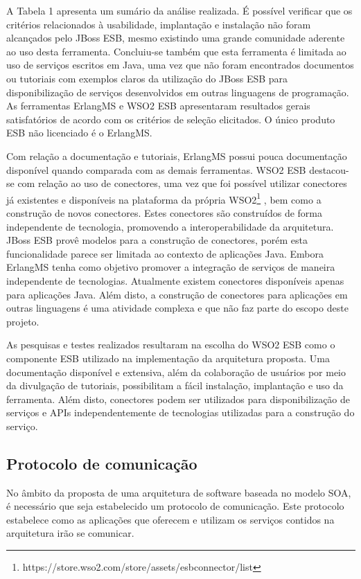 A Tabela 1 apresenta um sumário da análise realizada. É possível verificar que os critérios relacionados à usabilidade, implantação e instalação não foram alcançados pelo JBoss ESB, mesmo existindo uma grande comunidade aderente ao uso desta ferramenta. Concluiu-se também que esta ferramenta é limitada ao uso de serviços escritos em Java, uma vez que não foram encontrados documentos ou tutoriais com exemplos claros da utilização do JBoss ESB para disponibilização de serviços desenvolvidos em outras linguagens  de programação. As ferramentas ErlangMS e WSO2 ESB apresentaram resultados gerais satisfatórios de acordo com os critérios de seleção elicitados. O único produto ESB não licenciado é o ErlangMS.

Com relação a documentação e tutoriais, ErlangMS possui pouca documentação disponível quando comparada com as demais ferramentas. WSO2 ESB destacou-se com relação ao uso de conectores, uma vez que foi possível utilizar conectores já existentes e disponíveis na plataforma da própria WSO2\footnote{https://store.wso2.com/store/assets/esbconnector/list} , bem como a construção de novos conectores. Estes conectores são construídos de forma independente de tecnologia, promovendo a interoperabilidade da arquitetura. JBoss ESB provê modelos para a construção de conectores, porém esta funcionalidade parece ser limitada ao contexto de aplicações Java. Embora ErlangMS tenha como objetivo promover a integração de serviços de maneira independente de tecnologias. Atualmente existem conectores disponíveis apenas para aplicações Java. Além disto, a construção de conectores para aplicações em outras linguagens é uma atividade complexa e que  não faz parte do escopo deste projeto.

As pesquisas e testes realizados resultaram na escolha do WSO2 ESB como o componente ESB utilizado na implementação da arquitetura proposta. Uma documentação disponível e extensiva, além da colaboração de usuários por meio da divulgação de tutoriais, possibilitam a fácil instalação, implantação e uso da ferramenta. Além disto, conectores podem ser utilizados para disponibilização de serviços e APIs independentemente de tecnologias utilizadas para a construção do serviço. 

\subsection{Protocolo de comunicação}

No âmbito da proposta de uma arquitetura de software baseada no modelo SOA, é necessário que seja estabelecido um protocolo de comunicação. Este protocolo estabelece como as aplicações que oferecem e utilizam os serviços contidos na arquitetura irão se comunicar.

